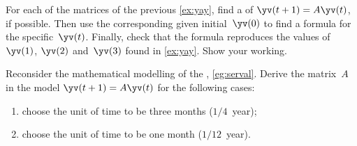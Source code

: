 \begin{exercise}  
For each of the matrices of the previous \autoref{ex:yay}, find a  of \(\yv(t+1)=A\yv(t)\), if possible.
Then use the corresponding given initial~\(\yv(0)\) to find a formula for the specific~\(\yv(t)\).
Finally, check that the formula reproduces the values of \(\yv(1)\), \(\yv(2)\) and~\(\yv(3)\) found in \autoref{ex:yay}.
Show your working.
\end{exercise}





\begin{exercise}  
Reconsider the mathematical modelling of the , \autoref{eg:serval}.
Derive the matrix~\(A\) in the model \(\yv(t+1)=A\yv(t)\) for the following cases:
\begin{enumerate}
\item choose the unit of time to be three months (\(1/4\)~year);

\item choose the unit of time to be one month  (\(1/12\)~year).

\end{enumerate}
\end{exercise}







